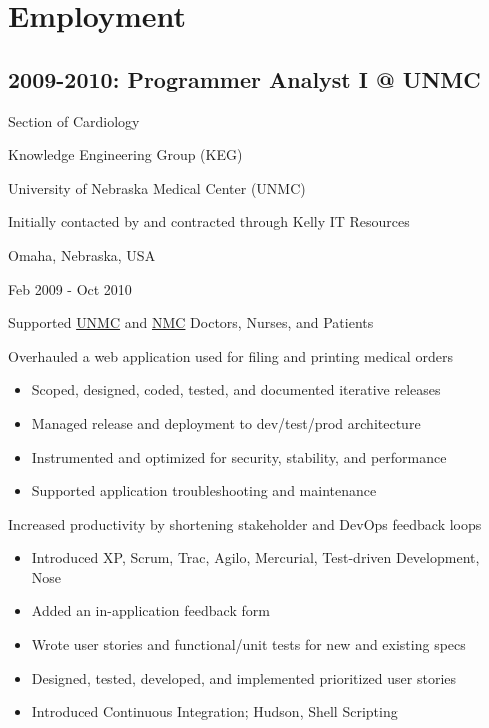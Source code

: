 \documentclass[letter,,openany,oneside]{sphinxhowto}
\begin{document}
\section{Employment}
\label{resume:employment}

\subsection{2009-2010: Programmer Analyst I @ UNMC}
\label{resume:programmer-analyst-i-unmc}
\begin{DUlineblock}{0em}
\item[] Section of Cardiology
\item[] Knowledge Engineering Group (KEG)
\item[] University of Nebraska Medical Center (UNMC)
\item[] Initially contacted by and contracted through Kelly IT Resources
\item[] Omaha, Nebraska, USA
\item[] Feb 2009 - Oct 2010
\end{DUlineblock}

Supported \href{https://en.wikipedia.org/wiki/University\_of\_Nebraska\_Medical\_Center}{UNMC}
and \href{https://en.wikipedia.org/wiki/Nebraska\_Medical\_Center}{NMC}
Doctors, Nurses, and Patients

Overhauled a web application used for filing and printing medical orders
\begin{itemize}
\item {} 
Scoped, designed, coded, tested, and documented iterative releases

\item {} 
Managed release and deployment to dev/test/prod architecture

\item {} 
Instrumented and optimized for security, stability, and performance

\item {} 
Supported application troubleshooting and maintenance

\end{itemize}

Increased productivity by shortening stakeholder and DevOps feedback loops
\begin{itemize}
\item {} 
Introduced XP, Scrum, Trac, Agilo, Mercurial, Test-driven Development, Nose

\item {} 
Added an in-application feedback form

\item {} 
Wrote user stories and functional/unit tests for new and existing specs

\item {} 
Designed, tested, developed, and implemented prioritized user stories

\item {} 
Introduced Continuous Integration; Hudson, Shell Scripting

\end{itemize}
\end{document}
